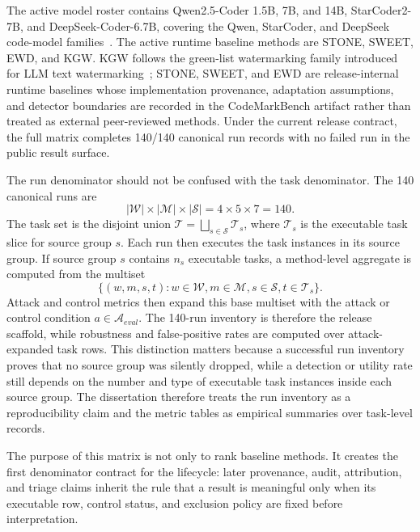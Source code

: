 The active model roster contains Qwen2.5-Coder 1.5B, 7B, and 14B, StarCoder2-7B, and DeepSeek-Coder-6.7B, covering the Qwen, StarCoder, and DeepSeek code-model families~\cite{hui2024qwen25coder,bigcode2024starcoder2,guo2024deepseekcoder}. The active runtime baseline methods are STONE, SWEET, EWD, and KGW. KGW follows the green-list watermarking family introduced for LLM text watermarking~\cite{kirchenbauer2023watermark}; STONE, SWEET, and EWD are release-internal runtime baselines whose implementation provenance, adaptation assumptions, and detector boundaries are recorded in the CodeMarkBench artifact rather than treated as external peer-reviewed methods. Under the current release contract, the full matrix completes 140/140 canonical run records with no failed run in the public result surface.

The run denominator should not be confused with the task denominator. The 140 canonical runs are
\begin{equation}
  |\mathcal{W}| \times |\mathcal{M}| \times |\mathcal{S}| = 4 \times 5 \times 7 = 140.
\end{equation}
The task set is the disjoint union $\mathcal{T}=\bigsqcup_{s\in\mathcal{S}}\mathcal{T}_s$, where $\mathcal{T}_s$ is the executable task slice for source group $s$. Each run then executes the task instances in its source group. If source group $s$ contains $n_s$ executable tasks, a method-level aggregate is computed from the multiset
\begin{equation}
  \{(w,m,s,t): w\in\mathcal{W}, m\in\mathcal{M}, s\in\mathcal{S}, t\in\mathcal{T}_s\}.
\end{equation}
Attack and control metrics then expand this base multiset with the attack or control condition $a\in\mathcal{A}_{eval}$. The 140-run inventory is therefore the release scaffold, while robustness and false-positive rates are computed over attack-expanded task rows.
This distinction matters because a successful run inventory proves that no source group was silently dropped, while a detection or utility rate still depends on the number and type of executable task instances inside each source group. The dissertation therefore treats the run inventory as a reproducibility claim and the metric tables as empirical summaries over task-level records.

The purpose of this matrix is not only to rank baseline methods. It creates the first denominator contract for the lifecycle: later provenance, audit, attribution, and triage claims inherit the rule that a result is meaningful only when its executable row, control status, and exclusion policy are fixed before interpretation.

